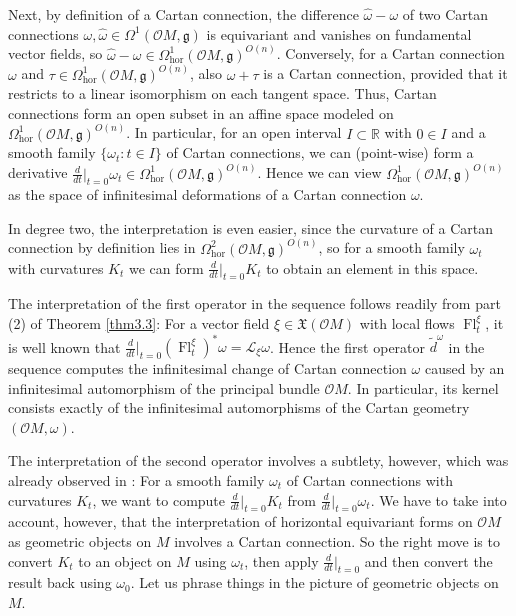 \documentclass[12pt,a4paper]{amsart}
\def\frak{\mathfrak}
\def\Bbb{\mathbb}
\def\Cal{\mathcal}
\newcommand{\om}{\omega}
\newcommand{\Om}{\Omega}
\newcommand{\hor}{\text{hor}}
\newcommand{\Fl}{\operatorname{Fl}}
\numberwithin{theorem}{section}
\numberwithin{equation}{section}
\theoremstyle{definition}
\theoremstyle{remark}
\begin{document}
Next, by definition of a Cartan connection, the difference $\widehat{\om}-\om$ of two
Cartan connections $\om,\widehat{\om}\in\Om^1(\Cal OM,\frak g)$ is equivariant and
vanishes on fundamental vector fields, so
$\widehat{\om}-\om\in\Om^1_{\hor}(\Cal OM,\frak g)^{O(n)}$. Conversely, for a Cartan
connection $\om$ and $\tau\in\Om^1_{\hor}(\Cal OM,\frak g)^{O(n)}$, also $\om+\tau$
is a Cartan connection, provided that it restricts to a linear isomorphism on each
tangent space.  Thus, Cartan connections form an open subset in an affine space
modeled on $\Om^1_{\hor}(\Cal OM,\frak g)^{O(n)}$. In particular, for an open interval
$I\subset\Bbb R$ with $0\in I$ and a smooth family $\{\om_t:t\in I\}$ of Cartan
connections, we can (point-wise) form a derivative
$\frac{d}{dt}|_{t=0}\om_t\in\Om^1_{\hor}(\Cal OM,\frak g)^{O(n)}$. Hence we can view
$\Om^1_{\hor}(\Cal OM,\frak g)^{O(n)}$ as the space of infinitesimal deformations of
a Cartan connection $\om$.

In degree two, the interpretation is even easier, since the curvature of a Cartan
connection by definition lies in $\Om^2_{\hor}(\Cal OM,\frak g)^{O(n)}$, so for a
smooth family $\om_t$ with curvatures $K_t$ we can form $\frac{d}{dt}|_{t=0}K_t$ to
obtain an element in this space.

The interpretation of the first operator in the sequence follows readily from part
(2) of Theorem \ref{thm3.3}:  For a vector field $\xi\in\frak X(\Cal OM)$ with local
flows $\Fl^{\xi}_t$, it is well known that $\frac{d}{dt}|_{t=0}(\Fl^\xi_t)^*\om=\Cal
L_{\xi}\om$. Hence the first operator $\widetilde{d}^{\om}$ in the sequence computes
the infinitesimal change of Cartan connection $\om$ caused by an infinitesimal
automorphism of the principal bundle $\Cal OM$. In particular, its kernel consists
exactly of the infinitesimal automorphisms of the Cartan geometry $(\Cal OM,\om)$.

The interpretation of the second operator involves a subtlety, however, which was
already observed in \cite{deformations}: For a smooth family $\om_t$ of Cartan
connections with curvatures $K_t$, we want to compute $\frac{d}{dt}|_{t=0}K_t$ from
$\frac{d}{dt}|_{t=0}\om_t$. We have to take into account, however, that the
interpretation of horizontal equivariant forms on $\Cal OM$ as geometric objects on
$M$ involves a Cartan connection. So the right move is to convert $K_t$ to an object
on $M$ using $\om_t$, then apply $\frac{d}{dt}|_{t=0}$ and then convert the result
back using $\om_0$. Let us phrase things in the picture of geometric objects on $M$.
\end{document}
